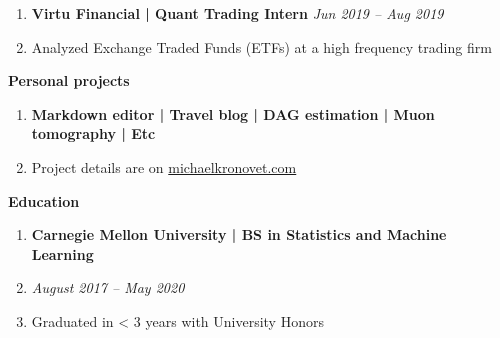 \documentclass[letterpaper,11pt]{article}
\begin{document}
\begin{enumerate}[leftmargin=10pt]
	\item[] \textbf{\Large Virtu Financial | \textcolor{myBlue}{Quant Trading Intern}}  \cftdotfill{\cftdotsep} \large \textit{\textcolor{myBlue}{Jun 2019 --} Aug 2019}\\
	\item[] \large Analyzed Exchange Traded Funds (ETFs) at a high frequency trading firm
\end{enumerate}

\begin{mybox}
	\hspace{-8pt} \textbf{\LARGE Personal projects}
\end{mybox}

\begin{enumerate}[leftmargin=10pt]
	\item[] \textbf{\Large Markdown editor | \textcolor{myBlue}{Travel blog} | DAG estimation | \textcolor{myBlue}{Muon tomography} | Etc}
	\item[] \large Project details are on \href{https://michaelkronovet.com}{\textcolor{myBlue}{michaelkronovet.com}}

\end{enumerate}


\begin{mybox}
	\hspace{-8pt} \textbf{\LARGE Education}
\end{mybox}

\begin{enumerate}[leftmargin=10pt]

	\item[] \textbf{\Large Carnegie Mellon University | \textcolor{myBlue}{BS in Statistics and Machine Learning}} \\
	\item[] \large \textit{\textcolor{myBlue}{August 2017 --} May 2020} \\
	\item[] \large Graduated in < 3 years with University Honors
\end{enumerate}
\end{document}
